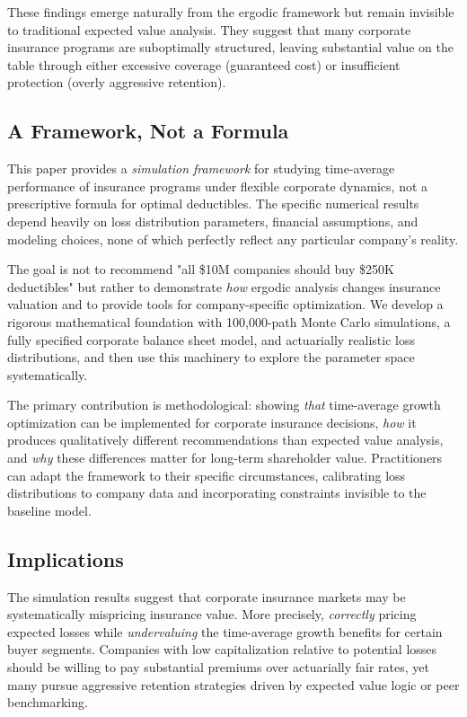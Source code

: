 \documentclass[11pt,letterpaper]{article}
\begin{document}
These findings emerge naturally from the ergodic framework but remain invisible to traditional expected value analysis. They suggest that many corporate insurance programs are suboptimally structured, leaving substantial value on the table through either excessive coverage (guaranteed cost) or insufficient protection (overly aggressive retention).

\subsection{A Framework, Not a Formula}

This paper provides a \emph{simulation framework} for studying time-average performance of insurance programs under flexible corporate dynamics, not a prescriptive formula for optimal deductibles. The specific numerical results depend heavily on loss distribution parameters, financial assumptions, and modeling choices, none of which perfectly reflect any particular company's reality.

The goal is not to recommend "all \$10M companies should buy \$250K deductibles" but rather to demonstrate \emph{how} ergodic analysis changes insurance valuation and to provide tools for company-specific optimization. We develop a rigorous mathematical foundation with 100,000-path Monte Carlo simulations, a fully specified corporate balance sheet model, and actuarially realistic loss distributions, and then use this machinery to explore the parameter space systematically.

The primary contribution is methodological: showing \emph{that} time-average growth optimization can be implemented for corporate insurance decisions, \emph{how} it produces qualitatively different recommendations than expected value analysis, and \emph{why} these differences matter for long-term shareholder value. Practitioners can adapt the framework to their specific circumstances, calibrating loss distributions to company data and incorporating constraints invisible to the baseline model.

\subsection{Implications}

The simulation results suggest that corporate insurance markets may be systematically mispricing insurance value. More precisely, \emph{correctly} pricing expected losses while \emph{undervaluing} the time-average growth benefits for certain buyer segments. Companies with low capitalization relative to potential losses should be willing to pay substantial premiums over actuarially fair rates, yet many pursue aggressive retention strategies driven by expected value logic or peer benchmarking.
\end{document}
